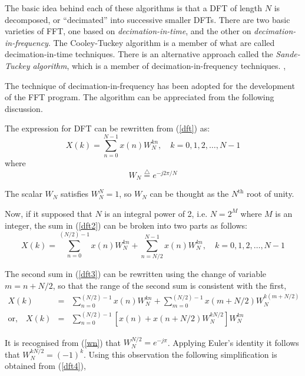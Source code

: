\documentclass[a4paper,11pt]{article}
\begin{document}
The basic idea behind each of these algorithms is that a DFT of length $N$ is decomposed, or ``decimated'' into successive smaller DFTs. There are two basic varieties of FFT, one based on \emph{decimation-in-time}, and the other on \emph{decimation-in-frequency}. The Cooley-Tuckey algorithm is a member of what are called decimation-in-time techniques. There is an alternative approach called the \emph{Sande-Tuckey algorithm}, which is a member of decimation-in-frequency techniques. \cite{chapra},\cite{nric}

The technique of decimation-in-frequency has been adopted for the development of the FFT program. The algorithm can be appreciated from the following discussion.

The expression for DFT can be rewritten from (\ref{dft}) as:
\begin{equation} \label{dft2}
X(k) = \sum_{n=0}^{N-1} x(n) W_{N}^{kn}, \quad k=0,1,2,\ldots,N-1
\end{equation}
where 
\begin{equation} \label{wn}
W_{N} \stackrel{\triangle}{=} e^{-j2\pi/N}
\end{equation}

The scalar $W_{N}$ satisfies $W_{N}^{N}=1$, so $W_{N}$ can be thought as the $N^{\mathrm{th}}$ root of unity.

Now, if it supposed that $N$ is an integral power of 2, i.e. $N=2^{M}$ where $M$ is an integer, the sum in (\ref{dft2}) can be broken into two parts as follows: 
\begin{equation} \label{dft3}
X(k) = \sum_{n=0}^{(N/2) - 1} x(n) W_{N}^{kn} + \sum_{n=N/2}^{N-1} x(n) W_{N}^{kn}, \quad k=0,1,2,\ldots,N-1
\end{equation}

The second sum in (\ref{dft3}) can be rewritten using the change of variable $m=n+N/2$, so that the range of the second sum is consistent with the first, 
\begin{eqnarray} 
X(k) & = & \sum_{n=0}^{(N/2) - 1} x(n) W_{N}^{kn} + \sum_{m=0}^{(N/2)-1} x(m+N/2) W_{N}^{k(m+N/2)} \nonumber \\
\textrm{or,}\quad X(k) & = & \sum_{n=0}^{(N/2) - 1} \left[ x(n) + x(n+N/2) W_{N}^{kN/2} \right] W_{N}^{kn} \label{dft4}
\end{eqnarray}

It is recognised from (\ref{wn}) that $W_{N}^{N/2} = e^{-j\pi}$. Applying Euler's identity it follows that $W_{N}^{kN/2} = (-1)^{k}$. Using this observation the following simplification is obtained from (\ref{dft4}),
\end{document}
